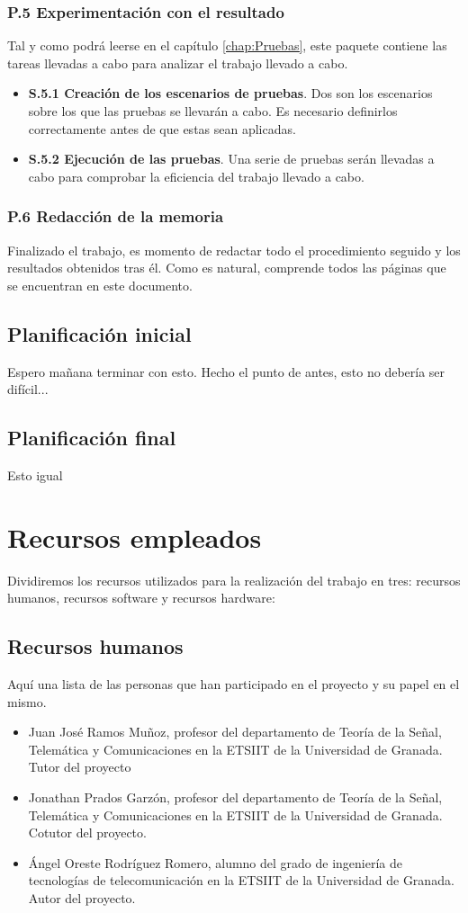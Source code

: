 \subsubsection{P.5 Experimentación con el resultado}
Tal y como podrá leerse en el capítulo \ref{chap:Pruebas}, este paquete contiene las tareas llevadas a cabo para analizar el trabajo llevado a cabo.
\begin{itemize}
\item \textbf{S.5.1 Creación de los escenarios de pruebas}. Dos son los escenarios sobre los que las pruebas se llevarán a cabo. Es necesario definirlos correctamente antes de que estas sean aplicadas.
\item \textbf{S.5.2 Ejecución de las pruebas}. Una serie de pruebas serán llevadas a cabo para comprobar la eficiencia del trabajo llevado a cabo.
\end{itemize}

\subsubsection{P.6 Redacción de la memoria}
Finalizado el trabajo, es momento de redactar todo el procedimiento seguido y los resultados obtenidos tras él. Como es natural, comprende todos las páginas que se encuentran en este documento.

\subsection{Planificación inicial}
Espero mañana terminar con esto. Hecho el punto de antes, esto no debería ser difícil...

\subsection{Planificación final}
Esto igual

\section{Recursos empleados}
Dividiremos los recursos utilizados para la realización del trabajo en tres: recursos humanos, recursos software y recursos hardware:

\subsection{Recursos humanos}
Aquí una lista de las personas que han participado en el proyecto y su papel en el mismo.
\begin{itemize}
\item Juan José Ramos Muñoz, profesor del departamento de Teoría de
la Señal, Telemática y Comunicaciones en la ETSIIT de la Universidad de Granada. Tutor del proyecto
\item Jonathan Prados Garzón, profesor del departamento de Teoría de
la Señal, Telemática y Comunicaciones en la ETSIIT de la Universidad de Granada.
Cotutor del proyecto.
\item Ángel Oreste Rodríguez Romero, alumno del grado de ingeniería de tecnologías de telecomunicación en la ETSIIT de la Universidad de Granada. Autor del proyecto.
\end{itemize}

